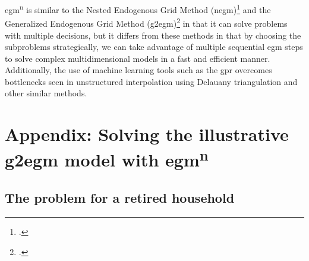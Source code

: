 \documentclass{article}
\begin{document}
\acrshort{egm}\textsuperscript{n} is similar to the Nested Endogenous Grid Method (\acrshort{negm})\footnote{\citet{Druedahl2021}.} and the Generalized Endogenous Grid Method (\acrshort{g2egm})\footnote{\citet{Druedahl2017}.} in that it can solve problems with multiple decisions, but it differs from these methods in that by choosing the subproblems strategically, we can take advantage of multiple sequential \acrshort{egm} steps to solve complex multidimensional models in a fast and efficient manner. Additionally, the use of machine learning tools such as the \acrshort{gpr} overcomes bottlenecks seen in unstructured interpolation using Delauany triangulation and other similar methods.






\section{Appendix: Solving the illustrative \acrshort{g2egm} model with \acrshort{egm}\textsuperscript{n}}\label{appendix}

\subsection{The problem for a retired household}
\end{document}
